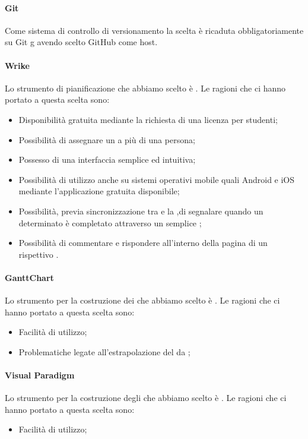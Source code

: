 \paragraph{Git}
Come sistema di controllo di versionamento la scelta è ricaduta obbligatoriamente su Git g avendo scelto GitHub come host.

\paragraph{Wrike}
Lo strumento di pianificazione che abbiamo scelto è .
Le ragioni che ci hanno portato a questa scelta sono:

\begin{itemize}
\item Disponibilità gratuita mediante la richiesta di una licenza per studenti;
\item Possibilità di assegnare un  a più di una persona;
\item Possesso di una interfaccia semplice ed intuitiva;
\item Possibilità di utilizzo anche su sistemi operativi mobile quali Android e iOS mediante l'applicazione gratuita disponibile;
\item Possibilità, previa sincronizzazione tra  e la  ,di segnalare quando un determinato  è completato attraverso un semplice ;
\item Possibilità di commentare e rispondere all'interno della pagina di un rispettivo .

\end{itemize}

\paragraph{GanttChart}
Lo strumento per la costruzione dei  che abbiamo scelto è .
Le ragioni che ci hanno portato a questa scelta sono:

\begin{itemize}
\item Facilità di utilizzo;
\item Problematiche legate all'estrapolazione del  da ;
\end{itemize}

\paragraph{Visual Paradigm}
Lo strumento per la costruzione degli  che abbiamo scelto è .
Le ragioni che ci hanno portato a questa scelta sono:
\begin{itemize}
\item Facilità di utilizzo;
\end{itemize}
\newpage 